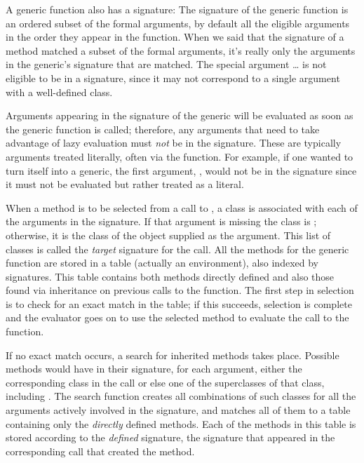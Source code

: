 \documentclass[11pt]{article}
\begin{document}
A generic function also has a signature:
The signature of the generic function is an ordered subset of the formal arguments, by default all the eligible arguments in the order they appear in the function.
When we said that the signature of a method matched a subset of the formal arguments, it's really only the arguments in the generic's signature that are matched.
The special argument \dots{} is not eligible to be in a signature, since it may not correspond to a single argument with a well-defined class.

Arguments appearing in the signature of the generic will be evaluated as soon as the generic function is called; therefore, any arguments that need to take advantage of lazy evaluation must \emph{not} be in the signature.
These are typically arguments treated literally, often via the  function.
For example, if one wanted to turn  itself into a generic, the first argument, , would not be in the signature since it must not be evaluated but rather treated as a literal.

When a method is to be selected from a call to , a class is associated with each of the arguments in the signature.
If that argument is missing the class is ; otherwise, it is the class of the object supplied as the argument.
This list of classes is called the \emph{target} signature for the call.
All the methods for the generic function are stored in a table (actually an \R{} environment), also indexed by signatures.
This table contains both methods directly defined and also those found via inheritance on previous calls to the function.
The first step in selection is to check for an exact match in the table; if this succeeds, selection is complete and the evaluator goes on to use the selected method to evaluate the call to the function.

If no exact match occurs, a search for inherited methods takes place.
Possible methods would have in their signature, for each argument,  either the corresponding class in the call or else one of the superclasses of that class, including .
The search function creates all combinations of such classes for all the arguments actively involved in the signature, and matches all of them to a table containing only the \emph{directly}  defined methods.
Each of the methods in this table is stored according to the \emph{defined}  signature, the signature that appeared in the corresponding  call that created the method.
\end{document}
